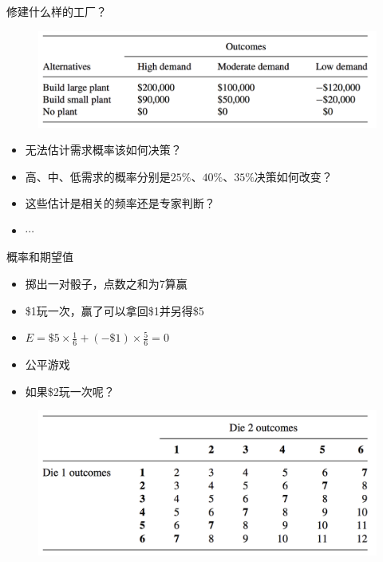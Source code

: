 \documentclass[UTF8]{ctexbeamer}
\begin{document}
\begin{frame}{修建什么样的工厂？}
  
  \begin{figure}
    \centering
    \includegraphics[width=\textwidth{}]{factories.png}
  \end{figure}

  \begin{itemize}
  \item 无法估计需求概率该如何决策？
  \item 高、中、低需求的概率分别是$25\%$、$40\%$、$35\%$决策如何改变？
  \item 这些估计是相关的频率还是专家判断？
  \item $\cdots$
  \end{itemize}

\end{frame}

\begin{frame}{概率和期望值}

  \begin{itemize}
  \item<1-> 掷出一对骰子，点数之和为7算赢
  \item<1-> \$1玩一次，赢了可以拿回\$1并另得\$5
  \item<2-> $E = \$5 \times \frac{1}{6} + (-\$1) \times \frac{5}{6} = 0$
  \item<3-> 公平游戏
  \item<4-> 如果\$2玩一次呢？
  \end{itemize}
  
  \begin{figure}
    \centering
    \includegraphics[width=\textwidth{}]{dice.png}
  \end{figure}
  
\end{frame}
\end{document}
